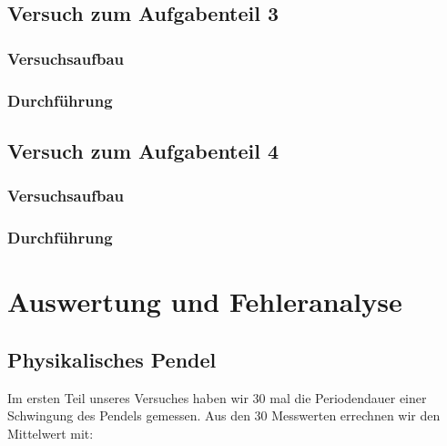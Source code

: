 \documentclass[11pt,a4paper]{article}
\begin{document}
       
       
       
       
       
       
       
       
       
       
       
       
       
       
       
       

\subsection{Versuch zum Aufgabenteil 3}
      \subsubsection{Versuchsaufbau}
      \subsubsection{Durchführung}

\subsection{Versuch zum Aufgabenteil 4}
     \subsubsection{Versuchsaufbau}
     \subsubsection{Durchführung}
\section{Auswertung und Fehleranalyse}
	\subsection{Physikalisches Pendel}
	
	Im ersten Teil unseres Versuches haben wir 30 mal die Periodendauer einer Schwingung des Pendels
	gemessen. Aus den 30 Messwerten errechnen wir den Mittelwert mit:
	
\end{document}

